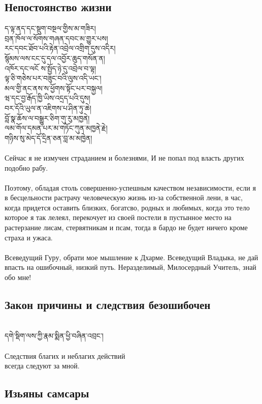 \subsection{Непостоянство жизни}
\ti
ད་ལྟ་ནད་དང་སྡུག་བསྔལ་གྱིས་མ་གཟིར།\\
བྲན་ཁོལ་ལ་སོགས་གཞན་དབང་མ་གྱུར་པས།\\
རང་དབང་ཐོབ་པའི་རྟེན་འབྲེལ་འགྲིག་དུས་འདིར།\\
སྙོམས་ལས་ངང་དུ་དལ་འབྱོར་ཆུད་གསོན་ན།\\
འཁོར་དང་ལངོ ས་སྤྱོད་ཉེ་དུ་འབྲེལ་བ་ལྟ།\\
ལྟ་ཅི་གཅེས་པར་བཟུང་བའི་ལུས་འདི་ཡང་།\\
མལ་གྱི་ནང་ནས་ས་ཕྱོགས་སྟོང་པར་བསྐྱལ།\\
ཝ་དང་བྱ་རྒོད་ཁྱི་ཡིས་འདྲད་པའི་དུས།\\
བར་དོའི་ཡུལ་ན་འཇིགས་པ་ཤིན་ཏུ་ཆེ།\\
བློ་སྣ་ཆོས་ལ་བསྒྱུར་ཅིག་གུ་རུ་མཁྱནེ།\\
ལམ་གོལ་དམན་པར་མ་གཏོང་ཀུན་མཁྱནེ་རྗེ།\\
གཉིས་སུ་མེད་དོ་དྲིན་ཅན་བླ་མ་མཁྱེན།\\
\\
\ru
Сейчас я не измучен страданием и болезнями,
И не попал под власть других подобно рабу.\\
\\
Поэтому, обладая столь совершенно-успешным качеством не\-зависимости,
если я в бесцельности растрачу человеческую жи\-знь из-за собственной лени,
в час, когда придется оста\-вить близких, богатсво, родных и любимых,
когда это тело которое я так лелеял,
перекочует из своей постели в пустынное место
на растерзание лисам, стервятникам и псам,
тогда в бардо не будет ничего кроме страха и ужаса.\\
\\
Всеведущий Гуру, обрати мое мышление к Дхарме.
Всеведущий Владыка, не дай впасть на ошибочный, низкий путь.
Нераздели\-мый, Милосердный Учитель, знай обо мне!

\newpage
\subsection{Закон причины и следствия безошибочен}
\\
\ti
དགེ་སྡིག་ལས་ཀྱི་རྣམ་སྨིན་ཕྱི་བཞིན་འབྲང་།\\
\\
\ru
Следствия благих и неблагих действий \\ \indent всегда следуют за мной.

\subsection{Изьяны самсары}

